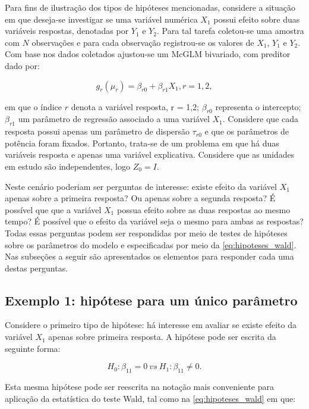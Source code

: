 Para fins de ilustração dos tipos de hipóteses mencionadas, considere a situação em que deseja-se investigar se uma variável numérica $X_1$ possui efeito sobre duas variáveis respostas, denotadas por $Y_1$ e $Y_2$. Para tal tarefa coletou-se uma amostra com $N$ observações e para cada observação registrou-se os valores de $X_1$, $Y_1$ e $Y_2$. Com base nos dados coletados ajustou-se um McGLM bivariado, com preditor dado por:

\begin{equation}
\label{eq:pred_ex}
g_r(\mu_r) = \beta_{r0} + \beta_{r1} X_1, r=1,2,
\end{equation}

\noindent em que o índice $r$ denota a variável resposta, r = 1,2; $\beta_{r0}$ representa o intercepto; $\beta_{r1}$ um parâmetro de regressão associado a uma variável $X_1$. Considere que cada resposta possui apenas um parâmetro de dispersão $\tau_{r0}$ e que os parâmetros de potência foram fixados. Portanto, trata-se de um problema em que há duas variáveis resposta e apenas uma variável explicativa. Considere que as unidades em estudo são independentes, logo $Z_0 = I$. 

Neste cenário poderiam ser perguntas de interesse: existe efeito da variável $X_1$ apenas sobre a primeira resposta? Ou apenas sobre a segunda resposta? É possível que que a variável $X_1$ possua efeito sobre as duas respostas ao mesmo tempo? É possível que o efeito da variável seja o mesmo para ambas as respostas? Todas essas perguntas podem ser respondidas por meio de testes de hipóteses sobre os parâmetros do modelo e especificadas por meio da \autoref{eq:hipoteses_wald}. Nas subseções a seguir são apresentados os elementos para responder cada uma destas perguntas. 

\subsection{Exemplo 1: hipótese para um único parâmetro}

Considere o primeiro tipo de hipótese: há interesse em avaliar se existe efeito da variável $X_1$ apenas sobre primeira resposta. A hipótese pode ser escrita da seguinte forma:

\begin{equation}
\label{eq:ex1}
H_0: \beta_{11} = 0 \ vs \ H_1: \beta_{11} \neq 0.
\end{equation}

Esta mesma hipótese pode ser reescrita na notação mais conveniente para aplicação da estatística do teste Wald, tal como na \autoref{eq:hipoteses_wald} em que:

